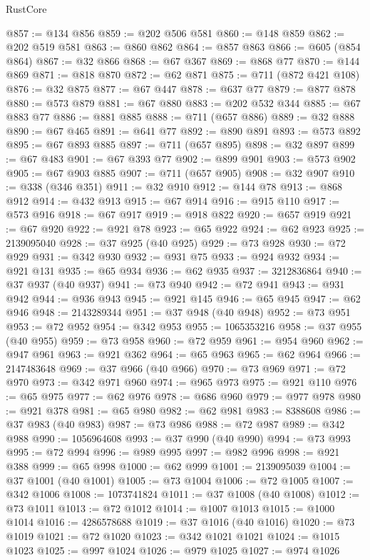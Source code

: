 \begin{lexlean}{RustCore}
\begin{coremodule}
@857 := @134 @856
@859 := @202 @506 @581
@860 := @148 @859
@862 := @202 @519 @581
@863 := @860 @862
@864 := @857 @863
@866 := @605 (@854 @864)
@867 := @32 @866
@868 := @67 @367
@869 := @868 @77
@870 := @144 @869
@871 := @818 @870
@872 := @62 @871
@875 := @711 (@872 @421 @108)
@876 := @32 @875
@877 := @67 @447
@878 := @637 @77
@879 := @877 @878
@880 := @573 @879
@881 := @67 @880
@883 := @202 @532 @344
@885 := @67 @883 @77
@886 := @881 @885
@888 := @711 (@657 @886)
@889 := @32 @888
@890 := @67 @465
@891 := @641 @77
@892 := @890 @891
@893 := @573 @892
@895 := @67 @893 @885
@897 := @711 (@657 @895)
@898 := @32 @897
@899 := @67 @483
@901 := @67 @393 @77
@902 := @899 @901
@903 := @573 @902
@905 := @67 @903 @885
@907 := @711 (@657 @905)
@908 := @32 @907
@910 := @338 (@346 @351)
@911 := @32 @910
@912 := @144 @78
@913 := @868 @912
@914 := @432 @913
@915 := @67 @914
@916 := @915 @110
@917 := @573 @916
@918 := @67 @917
@919 := @918 @822
@920 := @657 @919
@921 := @67 @920
@922 := @921 @78
@923 := @65 @922
@924 := @62 @923
@925 := 2139095040
@928 := @37 @925 (@40 @925)
@929 := @73 @928
@930 := @72 @929
@931 := @342 @930
@932 := @931 @75
@933 := @924 @932
@934 := @921 @131
@935 := @65 @934
@936 := @62 @935
@937 := 3212836864
@940 := @37 @937 (@40 @937)
@941 := @73 @940
@942 := @72 @941
@943 := @931 @942
@944 := @936 @943
@945 := @921 @145
@946 := @65 @945
@947 := @62 @946
@948 := 2143289344
@951 := @37 @948 (@40 @948)
@952 := @73 @951
@953 := @72 @952
@954 := @342 @953
@955 := 1065353216
@958 := @37 @955 (@40 @955)
@959 := @73 @958
@960 := @72 @959
@961 := @954 @960
@962 := @947 @961
@963 := @921 @362
@964 := @65 @963
@965 := @62 @964
@966 := 2147483648
@969 := @37 @966 (@40 @966)
@970 := @73 @969
@971 := @72 @970
@973 := @342 @971 @960
@974 := @965 @973
@975 := @921 @110
@976 := @65 @975
@977 := @62 @976
@978 := @686 @960
@979 := @977 @978
@980 := @921 @378
@981 := @65 @980
@982 := @62 @981
@983 := 8388608
@986 := @37 @983 (@40 @983)
@987 := @73 @986
@988 := @72 @987
@989 := @342 @988
@990 := 1056964608
@993 := @37 @990 (@40 @990)
@994 := @73 @993
@995 := @72 @994
@996 := @989 @995
@997 := @982 @996
@998 := @921 @388
@999 := @65 @998
@1000 := @62 @999
@1001 := 2139095039
@1004 := @37 @1001 (@40 @1001)
@1005 := @73 @1004
@1006 := @72 @1005
@1007 := @342 @1006
@1008 := 1073741824
@1011 := @37 @1008 (@40 @1008)
@1012 := @73 @1011
@1013 := @72 @1012
@1014 := @1007 @1013
@1015 := @1000 @1014
@1016 := 4286578688
@1019 := @37 @1016 (@40 @1016)
@1020 := @73 @1019
@1021 := @72 @1020
@1023 := @342 @1021 @1021
@1024 := @1015 @1023
@1025 := @997 @1024
@1026 := @979 @1025
@1027 := @974 @1026

\end{coremodule}
\end{lexlean}
